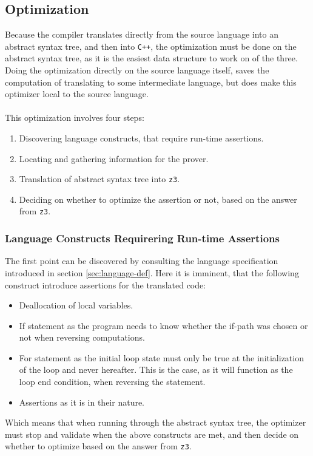 \subsection{Optimization \ms}
Because the compiler translates directly from the source language into an abstract syntax tree,
and then into \texttt{C++}, the optimization must be done on the abstract syntax tree, as it is
the easiest data structure to work on of the three. Doing the optimization directly on the source
language itself, saves the computation of translating to some intermediate language, but does
make this optimizer local to the source language.
\\
\\
This optimization involves four steps:
\begin{enumerate}
    \item Discovering language constructs, that require run-time assertions.
    \item Locating and gathering information for the prover.
    \item Translation of abstract syntax tree into \texttt{z3}.
    \item Deciding on whether to optimize the assertion or not, based on the answer
          from \texttt{z3}.
\end{enumerate}

\subsubsection{Language Constructs Requirering Run-time Assertions \rr}
The first point can be discovered by consulting the language specification introduced
in section \ref{sec:language-def}. Here it is imminent, that the following construct introduce
assertions for the translated code:
\begin{itemize} %
    \item Deallocation of local variables.
    \item If statement as the program needs to know whether the if-path was chosen or not when
          reversing computations.

    \item For statement as the initial loop state must only be true at the initialization of the
          loop and never hereafter. This is the case, as it will function as the loop end
          condition, when reversing the statement.

    \item Assertions as it is in their nature.
\end{itemize}
\noindent
Which means that when running through the abstract syntax tree, the optimizer must stop and validate
when the above constructs are met, and then decide on whether to optimize based on the answer from
\texttt{z3}.

